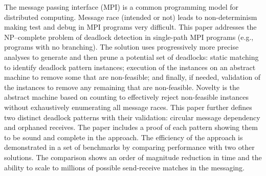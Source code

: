 The message passing interface (MPI) is a common programming model for distributed computing. Message race (intended or not) leads to non-determinism making test and debug in MPI programs very difficult. This paper addresses the NP--complete problem of deadlock detection in single-path MPI programs (e.g., programs with no branching). The solution uses progressively more precise analyses to generate and then prune a potential set of deadlocks: static matching to identify deadlock pattern instances; execution of the instances on an abstract machine to remove some that are non-feasible; and finally, if needed, validation of the instances to remove any remaining that are non-feasible. Novelty is the abstract machine based on counting to effectively reject non-feasible instances without exhaustively enumerating all message races. This paper further defines two distinct deadlock patterns with their validation: circular message dependency and orphaned receives. The paper includes a proof of each pattern showing them to be sound and complete in the approach. The efficiency of the approach is demonstrated in a set of benchmarks by comparing performance with two other solutions. The comparison shows an order of magnitude reduction in time and the ability to scale to millions of possible send-receive matches in the messaging.

